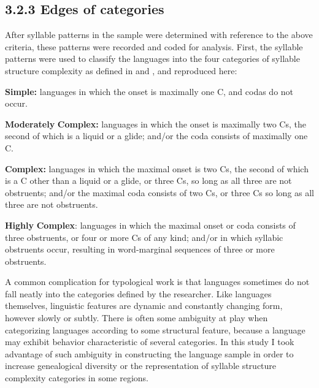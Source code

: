 \subsection{3.2.3 Edges of categories}

  After syllable patterns in the sample were determined with reference to the above criteria, these patterns were recorded and coded for analysis. First, the syllable patterns were used to classify the languages into the four categories of syllable structure complexity as defined in \citet{Maddieson2013a} and , and reproduced here:



\textbf{Simple:} languages in which the onset is maximally one C, and codas do not occur.



\textbf{Moderately} \textbf{Complex:} languages in which the onset is maximally two Cs, the second of which is a liquid or a glide; and/or the coda consists of maximally one C.



\textbf{Complex:} languages in which the maximal onset is two Cs, the second of which is a C other than a liquid or a glide, or three Cs, so long as all three are not obstruents; and/or the maximal coda consists of two Cs, or three Cs so long as all three are not obstruents.



\textbf{Highly} \textbf{Complex}: languages in which the maximal onset or coda consists of three obstruents, or four or more Cs of any kind; and/or in which syllabic obstruents occur, resulting in word-marginal sequences of three or more obstruents.



  A common complication for typological work is that languages sometimes do not fall neatly into the categories defined by the researcher. Like languages themselves, linguistic features are dynamic and constantly changing form, however slowly or subtly. There is often some ambiguity at play when categorizing languages according to some structural feature, because a language may exhibit behavior characteristic of several categories. In this study I took advantage of such ambiguity in constructing the language sample in order to increase genealogical diversity or the representation of syllable structure complexity categories in some regions.



